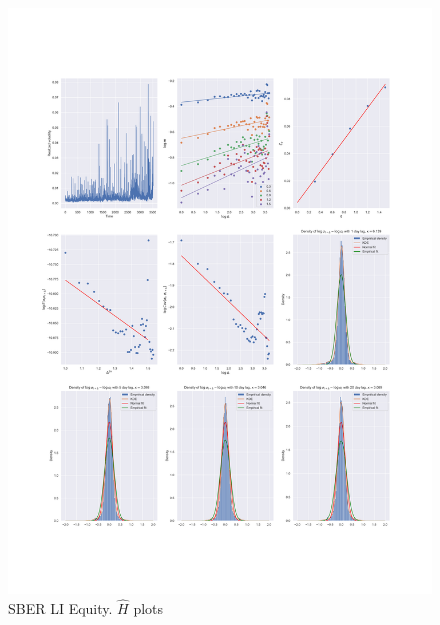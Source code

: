 \begin{figure}[h]
    \centering
    \includegraphics[width=\linewidth]{fig/SBER LI Equity.pdf}
    \caption{SBER LI Equity. $\hat{H}$ plots}
\end{figure} 

